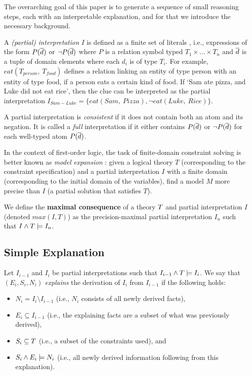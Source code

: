 The overarching goal of this paper is to generate a sequence of small reasoning steps, each with an interpretable explanation, and for that we introduce the necessary background.

A \emph{(partial) interpretation} $I$ is defined as a finite set of literals 
, i.e., expressions of the form 
$P(\overline{d})$ or $\lnot P(\overline{d})$ where $P$ is a relation symbol typed $T_1\times\dots \times T_n$ and $\overline{d}$ is a tuple of domain elements where each $d_i$ is of type $T_i$. For example, $eat(T_{person},\ T_{food})$ defines a relation linking an entity of type person with an entity of type food, if a person eats a certain kind of food.
If `Sam ate pizza, and Luke did not eat rice', then the clue can be interpreted as the partial interpretation $I_{Sam-Luke} = \{ eat(Sam,\ Pizza), \lnot eat(Luke,\ Rice)\}$.

A partial interpretation is \emph{consistent} if it does not contain both an atom and its negation.
It is called a \emph{full} interpretation if it either contains $P(\overline{d})$ or $\lnot P(\overline{d})$ for each well-typed atom $P(\overline{d})$.

In the context of first-order logic, the task of finite-domain constraint solving is better known as \emph{model expansion} \cite{MitchellTHM06}: given a logical theory $T$ (corresponding to the constraint specification) and a partial interpretation $I$ with a finite domain (corresponding to the initial domain of the variables), find a model $M$ more precise than $I$ (a partial solution that satisfies $T$).

We define the \textbf{maximal consequence} of a theory $T$ and partial interpretation $I$ (denoted $max(I,T)$) as the precision-maximal partial interpretation $I_n$ such that  $I \wedge T \models I_n$.

\subsection{Simple Explanation}

Let $I_{i-1}$ and $I_i$ be partial interpretations such that $I_{i-1}\land T \models I_i$.
We say that $(E_i,S_i,N_i)$ \emph{explains} the derivation of $I_{i}$ from $I_{i-1}$ if the following holds:
\begin{itemize}
   \item $N_i= I_i \setminus I_{i-1}$ (i.e., $N_i$ consists of all newly derived facts), 
   \item $E_i\subseteq I_{i-1}$ (i.e., the explaining facts are a subset of what was previously derived),
   \item $S_i \subseteq T$ (i.e., a subset of the constraints used), and 
   \item $S_i \land E_i \models N_i$ (i.e., all newly derived information following from this explanation).
\end{itemize}

